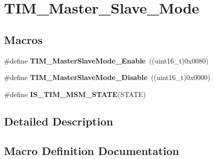 \hypertarget{group___t_i_m___master___slave___mode}{}\section{T\+I\+M\+\_\+\+Master\+\_\+\+Slave\+\_\+\+Mode}
\label{group___t_i_m___master___slave___mode}
\subsection*{Macros}
\begin{DoxyCompactItemize}
\item 
\#define {\bfseries T\+I\+M\+\_\+\+Master\+Slave\+Mode\+\_\+\+Enable}~((uint16\+\_\+t)0x0080)\hypertarget{group___t_i_m___master___slave___mode_gaef5da910ae6952fce424b440ea39f69a}{}\label{group___t_i_m___master___slave___mode_gaef5da910ae6952fce424b440ea39f69a}

\item 
\#define {\bfseries T\+I\+M\+\_\+\+Master\+Slave\+Mode\+\_\+\+Disable}~((uint16\+\_\+t)0x0000)\hypertarget{group___t_i_m___master___slave___mode_ga8d4c7c0f57469f384b1327bb323d28a3}{}\label{group___t_i_m___master___slave___mode_ga8d4c7c0f57469f384b1327bb323d28a3}

\item 
\#define {\bfseries I\+S\+\_\+\+T\+I\+M\+\_\+\+M\+S\+M\+\_\+\+S\+T\+A\+TE}(S\+T\+A\+TE)
\end{DoxyCompactItemize}


\subsection{Detailed Description}


\subsection{Macro Definition Documentation}
